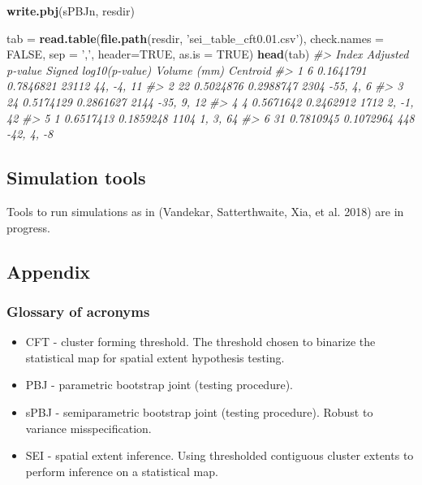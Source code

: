 \documentclass[]{article}
\newenvironment{Shaded}{\begin{snugshade}}{\end{snugshade}}
\newcommand{\CommentTok}[1]{\textcolor[rgb]{0.56,0.35,0.01}{\textit{#1}}}
\newcommand{\DataTypeTok}[1]{\textcolor[rgb]{0.13,0.29,0.53}{#1}}
\newcommand{\KeywordTok}[1]{\textcolor[rgb]{0.13,0.29,0.53}{\textbf{#1}}}
\newcommand{\NormalTok}[1]{#1}
\newcommand{\OtherTok}[1]{\textcolor[rgb]{0.56,0.35,0.01}{#1}}
\newcommand{\StringTok}[1]{\textcolor[rgb]{0.31,0.60,0.02}{#1}}
\providecommand{\tightlist}{%
  \setlength{\itemsep}{0pt}\setlength{\parskip}{0pt}}
\begin{document}
\begin{Shaded}
\begin{Highlighting}[]
\KeywordTok{write.pbj}\NormalTok{(sPBJn, resdir)}
\end{Highlighting}
\end{Shaded}

\begin{Shaded}
\begin{Highlighting}[]
\NormalTok{tab =}\StringTok{ }\KeywordTok{read.table}\NormalTok{(}\KeywordTok{file.path}\NormalTok{(resdir, }\StringTok{'sei_table_cft0.01.csv'}\NormalTok{), }\DataTypeTok{check.names =} \OtherTok{FALSE}\NormalTok{, }\DataTypeTok{sep =} \StringTok{','}\NormalTok{, }\DataTypeTok{header=}\OtherTok{TRUE}\NormalTok{, }\DataTypeTok{as.is =} \OtherTok{TRUE}\NormalTok{)}
\KeywordTok{head}\NormalTok{(tab)}
\CommentTok{#>   Index Adjusted p-value Signed log10(p-value) Volume (mm)   Centroid}
\CommentTok{#> 1     6        0.1641791             0.7846821       23112 44, -4, 11}
\CommentTok{#> 2    22        0.5024876             0.2988747        2304  -55, 4, 6}
\CommentTok{#> 3    24        0.5174129             0.2861627        2144 -35, 9, 12}
\CommentTok{#> 4     4        0.5671642             0.2462912        1712  2, -1, 42}
\CommentTok{#> 5     1        0.6517413             0.1859248        1104   1, 3, 64}
\CommentTok{#> 6    31        0.7810945             0.1072964         448 -42, 4, -8}
\end{Highlighting}
\end{Shaded}

\hypertarget{simulation-tools}{%
\subsection{Simulation tools}\label{simulation-tools}}

Tools to run simulations as in (Vandekar, Satterthwaite, Xia, et al.
2018) are in progress.

\hypertarget{appendix}{%
\subsection{Appendix}\label{appendix}}

\hypertarget{glossary-of-acronyms}{%
\subsubsection{Glossary of acronyms}\label{glossary-of-acronyms}}

\begin{itemize}
\tightlist
\item
  CFT - cluster forming threshold. The threshold chosen to binarize the
  statistical map for spatial extent hypothesis testing.
\item
  PBJ - parametric bootstrap joint (testing procedure).
\item
  sPBJ - semiparametric bootstrap joint (testing procedure). Robust to
  variance misspecification.
\item
  SEI - spatial extent inference. Using thresholded contiguous cluster
  extents to perform inference on a statistical map.
\end{itemize}
\end{document}
